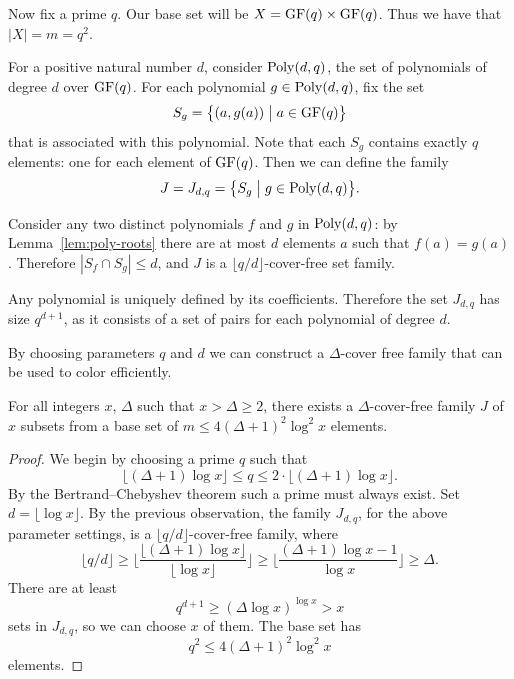 Now fix a prime $q$. Our base set will be $X = \operatorname{GF}(q) \times \operatorname{GF}(q)$. Thus we have that $|X| = m = q^2$.

For a positive natural number $d$, consider $\operatorname{Poly}(d,q)$, the set of polynomials of degree $d$ over $\operatorname{GF}(q)$. For each polynomial $g \in \operatorname{Poly}(d,q)$, fix the set \[S_g = \bigl\{ (a, g(a)) \bigm| a \in \operatorname{GF}(q) \bigr\}\] that is associated with this polynomial. Note that each $S_g$ contains exactly $q$ elements: one for each element of $\operatorname{GF}(q)$. Then we can define the family \[J = J_{d,q} = \bigl\{ S_g \bigm| g \in \operatorname{Poly}(d,q) \bigr\}.\]

Consider any two distinct polynomials $f$ and $g$ in $\operatorname{Poly}(d,q)$: by Lemma~\ref{lem:poly-roots} there are at most $d$ elements $a$ such that $f(a) = g(a)$. Therefore $|S_f \cap S_g| \leq d$, and $J$ is a $\lfloor q/d \rfloor$-cover-free set family.

Any polynomial is uniquely defined by its coefficients. Therefore the set $J_{d,q}$ has size $q^{d+1}$, as it consists of a set of pairs for each polynomial of degree $d$.

By choosing parameters $q$ and $d$ we can construct a $\Delta$-cover free family that can be used to color efficiently.

\begin{lemma} \label{lem:delta-cover-free}
  For all integers $x$, $\Delta$ such that $x > \Delta \geq 2$, there exists a $\Delta$-cover-free family $J$ of $x$ subsets from a base set of $m \leq 4(\Delta+1)^2 \log^2 x$ elements.
\end{lemma}

\begin{proof}
  We begin by choosing a prime $q$ such that
  \[
    \bigl\lfloor (\Delta+1)\log x \bigr\rfloor \leq q \leq 2 \cdot \bigl\lfloor (\Delta+1)\log x \bigr\rfloor.
  \]
  By the Bertrand--Chebyshev theorem such a prime must always exist. Set $d = \lfloor \log x \rfloor$. By the previous observation, the family $J_{d,q}$, for the above parameter settings, is a $\lfloor q / d \rfloor$-cover-free family, where 
  \[
    \lfloor q / d \rfloor \geq \biggl\lfloor \frac{\lfloor (\Delta+1)\log x \rfloor}{\lfloor \log x \rfloor} \biggr\rfloor \geq \biggl\lfloor \frac{(\Delta+1)\log x - 1}{\log x} \biggr\rfloor \geq \Delta.
  \]
  There are at least 
  \[
  q^{d+1} \geq (\Delta \log x)^{\log x } > x
  \]
  sets in $J_{d,q}$, so we can choose $x$ of them. The base set has \[q^2 \leq 4(\Delta+1)^2 \log^2 x\] elements.
\end{proof}

